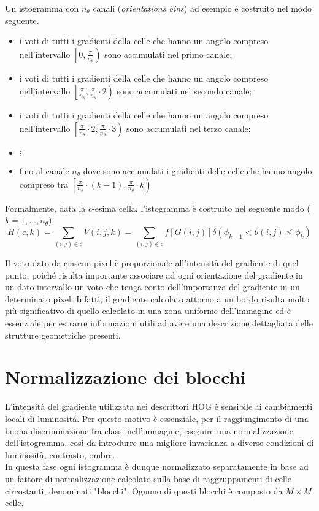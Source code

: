 Un istogramma con $n_{\theta}$ canali (\emph{orientations bins}) ad esempio è costruito nel modo seguente.
\begin{itemize} 
 \item i voti di tutti i gradienti della celle che hanno un angolo compreso nell'intervallo $\left [0, \frac{\pi}{n_{\theta}}\right )$ sono accumulati nel primo canale;
 \item i voti di tutti i gradienti della celle che hanno un angolo compreso nell'intervallo $\left [\frac{\pi}{n_{\theta}}, \frac{\pi}{n_{\theta}}\cdot 2\right )$ sono accumulati nel secondo canale;
 \item i voti di tutti i gradienti della celle che hanno un angolo compreso nell'intervallo $\left [\frac{\pi}{n_{\theta}}\cdot 2,\frac{\pi}{n_{\theta}}\cdot 3\right )$ sono accumulati nel terzo canale;
 \item[] $\vdots$
 \item fino al canale $n_{\theta}$ dove sono accumulati i gradienti delle celle che hanno angolo compreso tra $\left [\frac{\pi}{n_{\theta}}\cdot {(k-1)},\frac{\pi}{n_{\theta}}\cdot k\right )$
 \end{itemize}
Formalmente, data la $c$-esima cella, l'istogramma è costruito nel seguente modo ($k=1,\ldots,n_\theta$):
\begin{equation}
\label{eq:}
H(c,k)=\sum_{(i,j)\in\text{c}}V(i,j,k)=\sum_{(i,j)\in\text{c}}f[G(i,j)]\delta(\phi_{k-1}<\theta(i,j)\leq\phi_k)
\end{equation}

Il voto dato da ciascun pixel è proporzionale all'intensità del gradiente di quel punto, poiché risulta importante associare ad ogni orientazione del gradiente in un dato intervallo un voto che tenga conto dell'importanza del gradiente in un determinato pixel. 
Infatti, il gradiente calcolato attorno a un bordo risulta molto più significativo di quello calcolato in una zona uniforme dell'immagine ed è essenziale per estrarre informazioni utili ad avere una descrizione dettagliata delle strutture geometriche presenti. 

\section{Normalizzazione dei blocchi}
L'intensità del gradiente utilizzata nei descrittori HOG è sensibile ai cambiamenti locali di luminosità.
Per questo motivo è essenziale, per il raggiungimento di una buona discriminazione fra classi nell'immagine, eseguire una normalizzazione dell'istogramma, così da introdurre una migliore invarianza a diverse condizioni di luminosità, contrasto, ombre.\\
In questa fase ogni istogramma è dunque normalizzato separatamente in base ad un fattore di normalizzazione calcolato sulla base di raggruppamenti di celle circostanti, denominati "blocchi". Ognuno di questi blocchi è composto da $M \times M$ celle.

